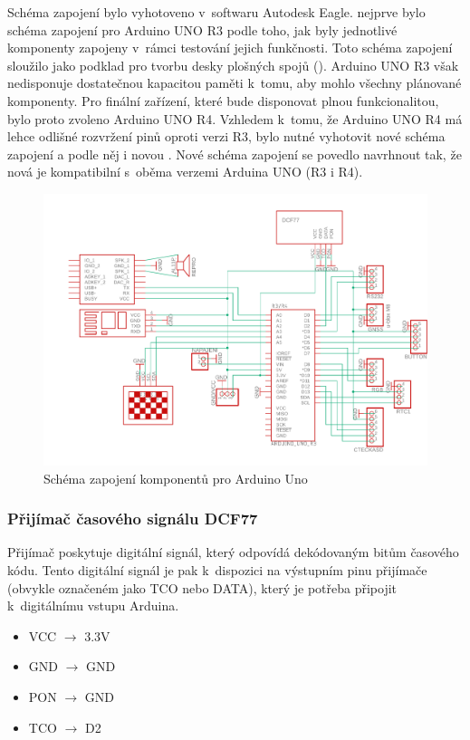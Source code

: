 Schéma zapojení bylo vyhotoveno v~softwaru Autodesk Eagle. nejprve bylo  schéma zapojení pro Arduino UNO R3 podle toho, jak byly jednotlivé komponenty zapojeny v~rámci testování jejich funkčnosti. Toto schéma zapojení sloužilo jako podklad pro tvorbu desky plošných spojů (). Arduino UNO R3 však nedisponuje dostatečnou kapacitou paměti k~tomu, aby mohlo  všechny plánované komponenty. Pro finální zařízení, které bude disponovat plnou funkcionalitou, bylo proto zvoleno Arduino UNO R4. Vzhledem k~tomu, že Arduino UNO R4 má lehce odlišné rozvržení pinů oproti verzi R3, bylo nutné vyhotovit nové schéma zapojení a podle něj i novou . Nové schéma zapojení se povedlo navrhnout tak, že nová  je kompatibilní s~oběma verzemi Arduina UNO (R3 i R4).

\begin{figure}[H]
	\centering
	\includegraphics[width=14.1cm]{images/schema_zapojeni.pdf}
	\caption{Schéma zapojení komponentů pro Arduino Uno}
\end{figure}

\subsubsection*{Přijímač časového signálu DCF77}
Přijímač poskytuje digitální signál, který odpovídá dekódovaným bitům časového kódu.
Tento digitální signál je pak k~dispozici na výstupním pinu přijímače (obvykle označeném jako TCO nebo DATA), který je potřeba připojit k~digitálnímu vstupu Arduina.
\begin{itemize}
    \tiny
    \setlength{\itemsep}{0pt} 
    \item VCC $\rightarrow$ 3.3V
    \item GND $\rightarrow$ GND
    \item PON $\rightarrow$ GND
    \item TCO $\rightarrow$ D2
\end{itemize}

